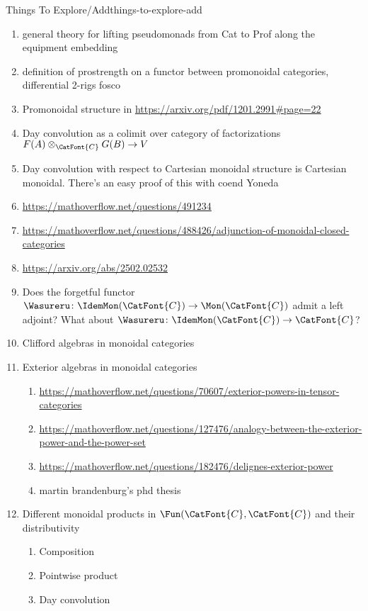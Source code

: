 \begin{remark}{Things To Explore/Add}{things-to-explore-add}
\begin{enumerate}
        \item general theory for lifting pseudomonads from Cat to Prof along the equipment embedding
        \item definition of prostrength on a functor between promonoidal categories, differential 2-rigs fosco
        \item Promonoidal structure in \url{https://arxiv.org/pdf/1201.2991#page=22}
        \item Day convolution as a colimit over category of factorizations $F(A)\otimes_{\CatFont{C}}G(B)\to V$
        \item Day convolution with respect to Cartesian monoidal structure is Cartesian monoidal. There's an easy proof of this with coend Yoneda
        \item \url{https://mathoverflow.net/questions/491234}
        \item \url{https://mathoverflow.net/questions/488426/adjunction-of-monoidal-closed-categories}
        \item \url{https://arxiv.org/abs/2502.02532}
        \item Does the forgetful functor $\Wasureru\colon\IdemMon(\CatFont{C})\to\Mon(\CatFont{C})$ admit a left adjoint? What about $\Wasureru\colon\IdemMon(\CatFont{C})\to\CatFont{C}$?
        \item Clifford algebras in monoidal categories
        \item Exterior algebras in monoidal categories
            \begin{enumerate}
                \item \url{https://mathoverflow.net/questions/70607/exterior-powers-in-tensor-categories}
                \item \url{https://mathoverflow.net/questions/127476/analogy-between-the-exterior-power-and-the-power-set}
                \item \url{https://mathoverflow.net/questions/182476/delignes-exterior-power}
                \item martin brandenburg's phd thesis
            \end{enumerate}
        \item Different monoidal products in $\Fun(\CatFont{C},\CatFont{C})$ and their distributivity
            \begin{enumerate}
                \item Composition
                \item Pointwise product
                \item Day convolution

\end{enumerate}
\end{enumerate}
\end{remark}
